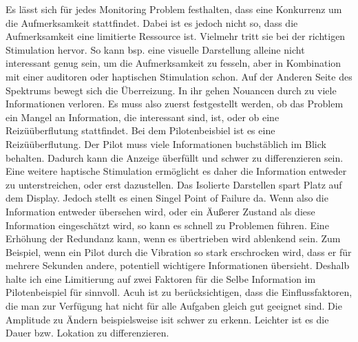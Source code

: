 \documentclass{llncs}					%
\begin{document}
Es lässt sich für jedes Monitoring Problem festhalten, dass eine Konkurrenz um die Aufmerksamkeit stattfindet. Dabei ist es jedoch nicht so, dass die Aufmerksamkeit eine limitierte Ressource ist. Vielmehr tritt sie bei der richtigen Stimulation hervor. So kann bsp. eine visuelle Darstellung alleine nicht interessant genug sein, um die Aufmerksamkeit zu fesseln, aber in Kombination mit einer auditoren oder haptischen Stimulation schon. Auf der Anderen Seite des Spektrums bewegt sich die Überreizung. In ihr gehen Nouancen durch zu viele Informationen verloren.
Es muss also zuerst festgestellt werden, ob das Problem ein Mangel an Information, die interessant sind, ist, oder ob eine Reizüüberflutung stattfindet. Bei dem Pilotenbeisbiel ist es eine Reizüüberflutung. Der Pilot muss viele Informationen buchstäblich im Blick behalten. Dadurch kann die Anzeige überfüllt und schwer zu differenzieren sein. Eine weitere haptische Stimulation ermöglicht es daher die Information entweder zu unterstreichen, oder erst dazustellen. Das Isolierte Darstellen spart Platz auf dem Display. Jedoch stellt es einen Singel Point of Failure da. Wenn also die Information entweder übersehen wird, oder ein Äußerer Zustand als diese Information eingeschätzt wird, so kann es schnell zu Problemen führen. Eine Erhöhung der Redundanz kann, wenn es übertrieben wird ablenkend sein. Zum Beispiel, wenn ein Pilot durch die Vibration so stark erschrocken wird, dass er für mehrere Sekunden andere, potentiell wichtigere Informationen übersieht. Deshalb halte ich eine Limitierung auf zwei Faktoren für die Selbe Information im Pilotenbeispiel für sinnvoll. Acuh ist zu berücksichtigen, dass die Einflussfaktoren, die man zur Verfügung hat nicht für alle Aufgaben gleich gut geeignet sind. Die Amplitude zu Ändern beispielsweise isit schwer zu erkenn. Leichter ist es die Dauer bzw. Lokation zu differenzieren.
\newpage

\newpage

\end{document}
